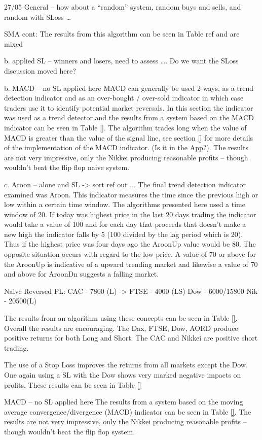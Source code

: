 27/05
General – how about a “random” system, random buys and sells, and random with SLoss …


SMA cont:
The results from this algorithm can be seen in Table ref{} and are mixed

b. applied SL – winners and losers, need to assess ….  Do we want the SLoss discussion moved here?

b. MACD – no SL applied here
MACD can generally be used 2 ways, as a trend detection indicator and as an over-bought / over-sold indicator in which case traders use it to identify potential market reversals. In this section the indicator was used as a trend detector and the results from a system based on the MACD indicator can be seen in Table \ref{}.  The algorithm trades long when the value of MACD is greater than the value of the signal line, see section \ref{} for more details of the implementation of the MACD indicator. (Is it in the App?). The results are not very impressive, only the Nikkei producing reasonable profits – though wouldn’t beat the flip flop naive system.

c. Aroon – alone and SL -> sort ref out ...
The final trend detection indicator examined was Aroon.  This indicator measures the time since the previous high or low within a certain time window. The algorithms presented here used a time window of 20. If today was highest price in the last 20 days trading the indicator would take a value of 100 and for each day that proceeds that doesn't make a new high the indicator falls by 5 (100 divided by the lag period which is 20).  Thus if the highest price was four days ago the AroonUp value would be 80. The opposite situation occurs with regard to the low price. A value of 70 or above for the AroonUp is indicative of a upward trending market and likewise a value of 70 and above for AroonDn suggests a falling market.

Naive Reversed PL:
CAC - 7800 (L)  -> 
FTSE - 4000 (LS)
Dow - 6000/15800
Nik - 20500(L)

The results from an algorithm using these concepts can be seen in Table \ref{}. Overall the results are encouraging.  The Dax, FTSE, Dow, AORD produce positive returns for both Long and Short. The CAC and Nikkei are positive short trading. 

The use of a Stop Loss improves the returns from all markets except the Dow. One again using a SL with the Dow shows very marked negative impacts on profits. These results can be seen in Table \ref{}

MACD – no SL applied here
The results from a system based on the moving average convergence/divergence (MACD) indicator can be seen in Table \ref{}. The results are not very impressive, only the Nikkei producing reasonable profits – though wouldn’t beat the flip flop system.

